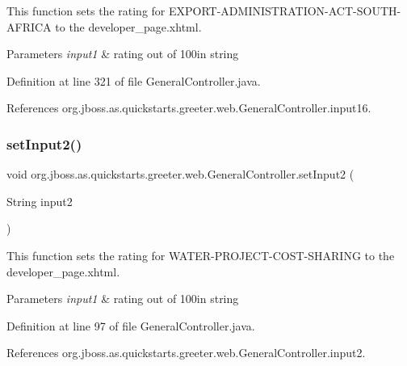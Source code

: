 This function sets the rating for E\+X\+P\+O\+R\+T-\/\+A\+D\+M\+I\+N\+I\+S\+T\+R\+A\+T\+I\+O\+N-\/\+A\+C\+T-\/\+S\+O\+U\+T\+H-\/\+A\+F\+R\+I\+CA to the developer\+\_\+page.\+xhtml. 


\begin{DoxyParams}{Parameters}
{\em input1} & rating out of 100in string \\
\hline
\end{DoxyParams}


Definition at line 321 of file General\+Controller.\+java.



References org.\+jboss.\+as.\+quickstarts.\+greeter.\+web.\+General\+Controller.\+input16.

\mbox{\label{classorg_1_1jboss_1_1as_1_1quickstarts_1_1greeter_1_1web_1_1_general_controller_a3b877ba2cf3f65eed4c4853a18b932a8}} 
\subsubsection{\texorpdfstring{set\+Input2()}{setInput2()}}
{\footnotesize\ttfamily void org.\+jboss.\+as.\+quickstarts.\+greeter.\+web.\+General\+Controller.\+set\+Input2 (\begin{DoxyParamCaption}\item[{String}]{input2 }\end{DoxyParamCaption})}



This function sets the rating for W\+A\+T\+E\+R-\/\+P\+R\+O\+J\+E\+C\+T-\/\+C\+O\+S\+T-\/\+S\+H\+A\+R\+I\+NG to the developer\+\_\+page.\+xhtml. 


\begin{DoxyParams}{Parameters}
{\em input1} & rating out of 100in string \\
\hline
\end{DoxyParams}


Definition at line 97 of file General\+Controller.\+java.



References org.\+jboss.\+as.\+quickstarts.\+greeter.\+web.\+General\+Controller.\+input2.

